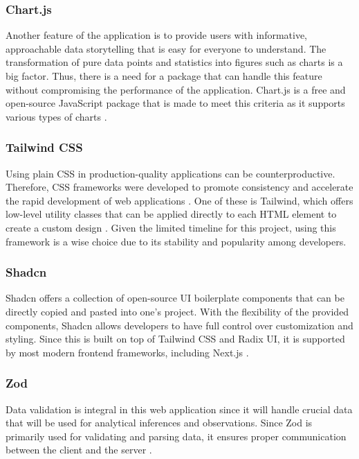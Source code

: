 \subsubsection{Chart.js}
Another feature of the application is to provide users with informative, approachable data storytelling that is easy for everyone to understand. The transformation of pure data points and statistics into figures such as charts is a big factor. Thus, there is a need for a package that can handle this feature without compromising the performance of the application. Chart.js is a free and open-source JavaScript package that is made to meet this criteria as it supports various types of charts \cite{chartjs-no-date}. 

\subsubsection{Tailwind CSS}
Using plain CSS in production-quality applications can be counterproductive. Therefore, CSS frameworks were developed to promote consistency and accelerate the rapid development of web applications \cite{joel-2021}. One of these is Tailwind, which offers low-level utility classes that can be applied directly to each HTML element to create a custom design \cite{tailwind-no-date}. Given the limited timeline for this project, using this framework is a wise choice due to its stability and popularity among developers.

\subsubsection{Shadcn}
Shadcn offers a collection of open-source UI boilerplate components that can be directly copied and pasted into one's project. With the flexibility of the provided components, Shadcn allows developers to have full control over customization and styling. Since this is built on top of Tailwind CSS and Radix UI, it is supported by most modern frontend frameworks, including Next.js \cite{shadcn-no-date}.

\subsubsection{Zod}
Data validation is integral in this web application since it will handle crucial data that will be used for analytical inferences and observations. Since Zod is primarily used for validating and parsing data, it ensures proper communication between the client and the server \cite{zod-nd}. 


